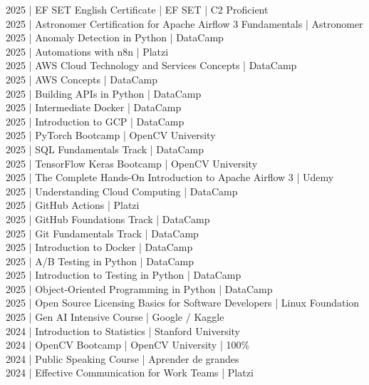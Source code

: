 {
2025 | EF SET English Certificate | EF SET | C2 Proficient \\
2025 | Astronomer Certification for Apache Airflow 3 Fundamentals | Astronomer \\
2025 | Anomaly Detection in Python | DataCamp \\
2025 | Automations with n8n | Platzi \\
2025 | AWS Cloud Technology and Services Concepts | DataCamp \\
2025 | AWS Concepts | DataCamp \\
2025 | Building APIs in Python | DataCamp \\
2025 | Intermediate Docker | DataCamp \\
2025 | Introduction to GCP | DataCamp \\
2025 | PyTorch Bootcamp | OpenCV University \\
2025 | SQL Fundamentals Track | DataCamp \\
2025 | TensorFlow Keras Bootcamp | OpenCV University \\
2025 | The Complete Hands-On Introduction to Apache Airflow 3 | Udemy \\
2025 | Understanding Cloud Computing | DataCamp \\
2025 | GitHub Actions | Platzi \\
2025 | GitHub Foundations Track | DataCamp \\
2025 | Git Fundamentals Track | DataCamp \\
2025 | Introduction to Docker | DataCamp \\
2025 | A/B Testing in Python | DataCamp \\
2025 | Introduction to Testing in Python  | DataCamp \\
2025 | Object-Oriented Programming in Python | DataCamp \\
2025 | Open Source Licensing Basics for Software Developers | Linux Foundation \\
2025 | Gen AI Intensive Course  | Google / Kaggle \\
2024 | Introduction to Statistics | Stanford University \\
2024 | OpenCV Bootcamp | OpenCV University | 100\% \\
2024 | Public Speaking Course | Aprender de grandes \\
2024 | Effective Communication for Work Teams | Platzi \\
}
